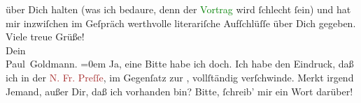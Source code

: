                über Dich halten (was ich bedaure, denn der \textcolor{green}{Vortrag}{}\ledrightnote{{$\rightarrow$}\textcolor{green}{[Vortrag über Arthur Schnitzler]}} wird ſchlecht ſein) und hat mir inzwiſchen im
               Geſpräch werthvolle literariſche Aufſchlüſſe über Dich gegeben.\pend
           \pstart
           Viele treue Grüße! {\\[\baselineskip]}Dein {\\[\baselineskip]}\spacefill\mbox{Paul Goldmann.}\pend
           \leftskip=0em{}\pstart
           \noindent{}Ja, eine Bitte habe ich doch. Ich habe den Eindruck, daß ich in der \textcolor{brown}{N. Fr. Preſſe}{}\ledrightnote{\textcolor{brown}{Neue Freie Presse}}, im Gegenſatz zur \label{K_L02905-57v}\label{K_L02905-57h}, vollſtändig verſchwinde. Merkt irgend Jemand, außer
                  Dir, daß ich vorhanden bin? Bitte, ſchreib’ mir ein Wort darüber!\pend
           \endnumbering{}  
      
